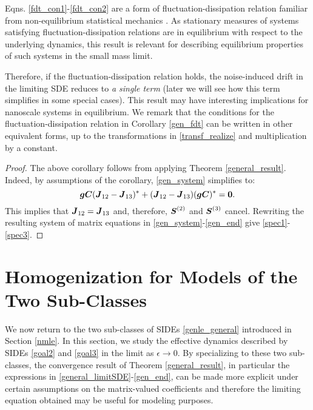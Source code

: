 Eqns. \eqref{fdt_con1}-\eqref{fdt_con2} are a form of fluctuation-dissipation relation familiar from non-equilibrium statistical mechanics \cite{toda2012statistical}. As stationary measures of systems satisfying fluctuation-dissipation relations are in equilibrium with respect to the underlying dynamics, this result is relevant for describing equilibrium properties of such systems in the small mass limit. 

\begin{remark} 
Therefore, if the fluctuation-dissipation relation holds, the noise-induced drift in the limiting SDE reduces to {\it a single term} (later we will see how this term simplifies in some special cases).  This result may have interesting implications for nanoscale systems in equilibrium.
We remark that the conditions for the fluctuation-dissipation relation in Corollary \ref{gen_fdt} can be written in other equivalent forms, up to the transformations in \eqref{transf_realize} and multiplication by a constant. 
\end{remark}

\begin{proof}
The above corollary follows from applying Theorem \ref{general_result}. Indeed, by assumptions of the corollary, \eqref{gen_system} simplifies to:
\begin{equation}
\boldsymbol{g} \boldsymbol{C} (\boldsymbol{J}_{12}-\boldsymbol{J}_{13})^* + (\boldsymbol{J}_{12}-\boldsymbol{J}_{13}) (\boldsymbol{g} \boldsymbol{C})^* = \boldsymbol{0}.
\end{equation}
This implies that $\boldsymbol{J}_{12} = \boldsymbol{J}_{13}$ and, therefore, $\boldsymbol{S}^{(2)}$ and $\boldsymbol{S}^{(3)}$ cancel. Rewriting the resulting system of matrix equations in \eqref{gen_system}-\eqref{gen_end} give \eqref{spec1}-\eqref{spec3}. 
\end{proof}




\section{Homogenization for Models of the Two Sub-Classes} \label{homog}

We now return to the two sub-classes of SIDEs \eqref{genle_general} introduced in Section \ref{nmle}. In this section, we study the effective dynamics described by SIDEs \eqref{goal2} and \eqref{goal3} in the limit as $\epsilon \to 0$. By specializing to these two sub-classes, the convergence result of Theorem \ref{general_result}, in particular the expressions in \eqref{general_limitSDE}-\eqref{gen_end}, can be made more explicit under certain assumptions on the matrix-valued coefficients  and therefore the limiting equation obtained may be useful for modeling purposes. 

